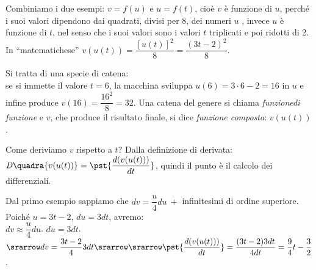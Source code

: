 Combiniamo i due esempi: $v=f(u)$ e $u=f(t)$, cioè $v$ è funzione di $u$, 
perché i suoi valori dipendono dai quadrati, divisi per $8$, dei numeri $u$ 
,
invece $u$ è funzione di $t$, nel senso che i suoi valori sono i valori $t$ 
triplicati e poi ridotti di 2. In ``matematichese'' 
$v(u(t))=\dfrac{[u(t)]^2}{8}=\dfrac{(3t-2)^2}{8}$.


\begin{inaccessibleblock}
 \begin{center}
 \begin{minipage}[]{.48\textwidth}
  \boxfcomposta
 \end{minipage} 
 \hfill
 \begin{minipage}[]{.48\textwidth}
Si tratta di una specie di catena:\\
se si immette il valore $t=6$, la macchina sviluppa $u(6)=3\cdot 6-2=16$ in 
$u$
e infine produce $v(16)=\dfrac{16^2}{8}=32$. Una catena del genere si 
chiama 
\emph{funzionedi funzione} e $v$, che produce il risultato finale, si dice
\emph{funzione composta}: $v(u(t))$.\\
 \end{minipage}
 \end{center}
\end{inaccessibleblock}
\label{}

Come deriviamo  $v$ rispetto a $t$? Dalla definizione di derivata: 
$\mathit{D}\quadra{v(u(t))}=\pst{\dfrac{d(v(u(t)))}{dt}}$, 
quindi il punto è il calcolo dei differenziali.
\begin{inaccessibleblock}
 \begin{center}
 \begin{minipage}[]{.48\textwidth}
  \diffcomposta
 \end{minipage} 
  \hfill
 \begin{minipage}[]{.48\textwidth}
Dal primo esempio sappiamo che $dv=\dfrac{u}{4}du\ +$ infinitesimi di 
ordine 
superiore.
Poiché $u=3t-2$, $du=3dt$, avremo:\\
$dv\approx \dfrac{u}{4}du$. \hspace{1cm} $du=3dt$. $\srarrow 
dv=\dfrac{3t-2}{4}3dt \srarrow\\ 
\srarrow 
\pst{\dfrac{d(v(u(t)))}{dt}}=\dfrac{(3t-2)3dt}{4dt}=\dfrac{9}{4}t-\dfrac{3}{
2}$.\\
 \end{minipage}
 \end{center}
\end{inaccessibleblock}
\label{}

